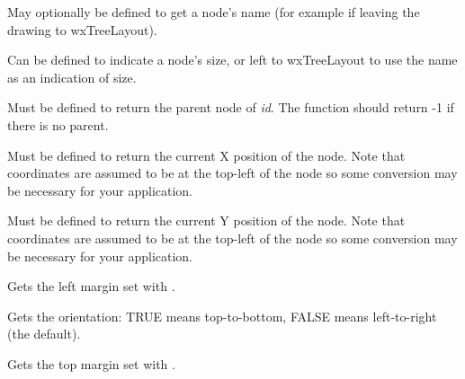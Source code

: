 

May optionally be defined to get a node's name (for example if leaving
the drawing to wxTreeLayout).



Can be defined to indicate a node's size, or left to wxTreeLayout to use the
name as an indication of size.

\label{getnodeparent}


Must be defined to return the parent node of {\it id}.
The function should return -1 if there is no parent.



Must be defined to return the current X position of the node. Note that
coordinates are assumed to be at the top-left of the node so some conversion
may be necessary for your application.



Must be defined to return the current Y position of the node. Note that
coordinates are assumed to be at the top-left of the node so some conversion
may be necessary for your application.



Gets the left margin set with .



Gets the orientation: TRUE means top-to-bottom, FALSE means left-to-right (the default).



Gets the top margin set with .

